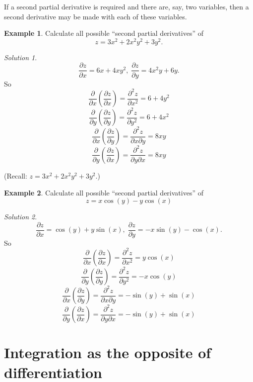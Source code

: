 \documentclass[
  english,
  11pt,
  oneside]{book}
\newcommand{\slide}{}
\theoremstyle{definition}
\theoremstyle{definition}
\newtheorem{example}{Example}[chapter]
\theoremstyle{definition}
\theoremstyle{definition}
\theoremstyle{remark}
\newtheorem*{solution}{Solution}
\begin{document}
If a second partial derivative is required and there are, say, two variables, then a second derivative may be made with each of these variables.

\begin{example}
Calculate all possible ``second partial derivatives'' of
\[
z=3x^2+2x^2y^2+3y^2.
\]
\end{example}

\begin{solution}
\[
\frac{\partial z}{\partial x} = 6x+4xy^2,\;\frac{\partial z}{\partial y} = 4x^2y+6y.
\]
So
\[
\frac{\partial}{\partial x}\left(\frac{\partial z}{\partial x}\right) = \frac{\partial^2 z}{\partial x^2} = 6+4y^2
\]
\[
\frac{\partial}{\partial y}\left(\frac{\partial z}{\partial y}\right) = \frac{\partial^2 z}{\partial y^2} = 6+4x^2
\]
\[
\frac{\partial}{\partial x}\left(\frac{\partial z}{\partial y}\right) = \frac{\partial^2 z}{\partial x\partial y} = 8xy
\]
\[
\frac{\partial}{\partial y}\left(\frac{\partial z}{\partial x}\right) = \frac{\partial^2 z}{\partial y\partial x} = 8xy
\]
\end{solution}

\begin{slidesonly}

\slide

(Recall: \(z=3x^2+2x^2y^2+3y^2\).)
\slide

\end{slidesonly}

\begin{example}
Calculate all possible ``second partial derivatives'' of
\[
z = x\cos(y)-y\cos(x)
\]
\end{example}

\begin{solution}
\[
\frac{\partial z}{\partial x} = \cos(y)+y\sin(x),\;\frac{\partial z}{\partial y} = -x\sin(y)-\cos(x).
\]
So
\[
\frac{\partial}{\partial x}\left(\frac{\partial z}{\partial x}\right) = \frac{\partial^2 z}{\partial x^2} = y\cos(x)
\]
\[
\frac{\partial}{\partial y}\left(\frac{\partial z}{\partial y}\right) = \frac{\partial^2 z}{\partial y^2} = -x\cos(y)
\]
\[
\frac{\partial}{\partial x}\left(\frac{\partial z}{\partial y}\right) = \frac{\partial^2 z}{\partial x\partial y} = -\sin(y)+\sin(x)
\]
\[
\frac{\partial}{\partial y}\left(\frac{\partial z}{\partial x}\right) = \frac{\partial^2 z}{\partial y\partial x} = -\sin(y)+\sin(x)
\]
\end{solution}

\slide

\section{Integration as the opposite of differentiation}\label{integration-as-the-opposite-of-differentiation}
\end{document}
